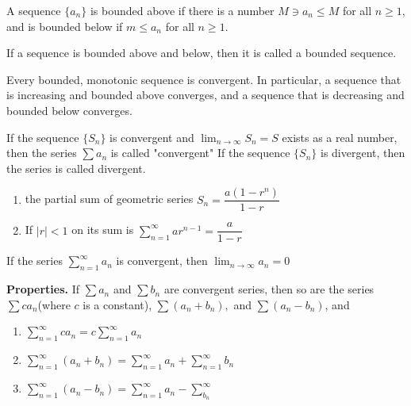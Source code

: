 \begin{defn}
	A sequence $\{a_n\}$ is bounded above if there is a number $M \ni a_n \leq M$ for all $n \geq 1$, and is bounded below if $m \leq a_n$ for all $n \geq 1$.
	
	If a sequence is bounded above and below, then it is called a bounded sequence.	
\end{defn}


\begin{thm*}
	Every bounded, monotonic sequence is convergent. In particular, a sequence that is increasing and bounded above converges, and a sequence that is decreasing and bounded below converges.
\end{thm*}

\begin{defn}
	If the sequence $\{S_n\}$ is convergent and $\lim_{n \rightarrow \infty}S_n = S$ exists as a real number, then the series $\sum a_n$ is called "convergent" If the sequence $\{S_n\}$ is divergent, then the series is called divergent.	
\end{defn}


\begin{defn}
	\begin{enumerate}[label = $\bullet$]
		\item the partial sum of geometric series $S_n = \dfrac{a(1 - r^n)}{1 - r}$
		\item If $|r| < 1$ on its sum is $\sum^{\infty}_{n = 1}ar^{n-1} = \dfrac{a}{1-r}$
	\end{enumerate}

\end{defn}


\begin{thm*}
	If the series $\sum^{\infty}_{n=1}a_n$ is convergent, then $\lim_{n \rightarrow \infty} a_n = 0$	
\end{thm*}


\textbf{Properties.} If $\sum a_n$ and $\sum b_n$ are convergent series, then so are the series $\sum ca_n$(where $c$ is a constant), $\sum (a_n + b_n),$ and $\sum(a_n - b_n)$, and

\begin{enumerate}[wide,label = $(roman*)$]
	\item $\sum^{\infty}_{n = 1}ca_n = c\sum^{\infty}_{n = 1}a_n$
	\item $\sum^{\infty}_{n = 1}(a_n + b_n) = \sum^{\infty}_{n = 1}a_n + \sum^{\infty}_{n = 1}b_n$
	\item $\sum^{\infty}_{n = 1}(a_n - b_n) = \sum^{\infty}_{n = 1}a_n - \sum^{\infty}_{b_n}$
\end{enumerate}

